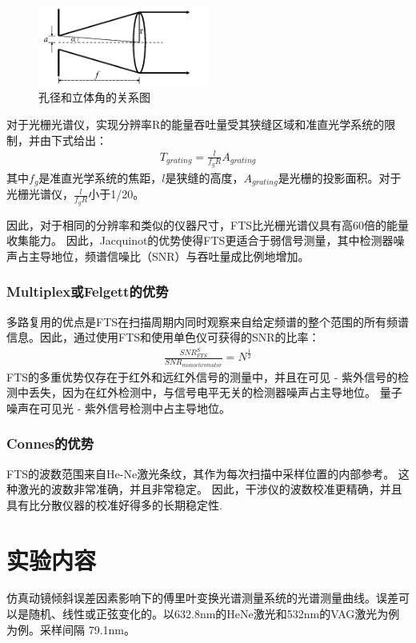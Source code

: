 \documentclass[conference]{IEEEtran}
\begin{document}
\begin{figure}[htbp]
    \centerline{\includegraphics[width=0.5\textwidth]{pic12.png}}
    \caption{孔径和立体角的关系图}
    \label{pic12}
\end{figure}

对于光栅光谱仪，实现分辨率R的能量吞吐量受其狭缝区域和准直光学系统的限制，并由下式给出：
\begin{align}
    T_{grating} = \frac{l}{f_gR}A_{grating}
\end{align}
其中$f_g$是准直光学系统的焦距，$l$是狭缝的高度，$A_{grating}$是光栅的投影面积。对于光栅光谱仪，$\frac{l}{f_gR}$小于1/20。

因此，对于相同的分辨率和类似的仪器尺寸，FTS比光栅光谱仪具有高60倍的能量收集能力。 因此，Jacquinot的优势使得FTS更适合于弱信号测量，其中检测器噪声占主导地位，频谱信噪比（SNR）与吞吐量成比例地增加。

\subsubsection{Multiplex或Felgett的优势} 
多路复用的优点是FTS在扫描周期内同时观察来自给定频谱的整个范围的所有频谱信息。因此，通过使用FTS和使用单色仪可获得的SNR的比率：
\begin{align}
    \frac{SNR^S_{FTS}}{SNR_{monochromator}} = N^{\frac{1}{2}}
\end{align}
FTS的多重优势仅存在于红外和远红外信号的测量中，并且在可见 - 紫外信号的检测中丢失，因为在红外检测中，与信号电平无关的检测器噪声占主导地位。 量子噪声在可见光 - 紫外信号检测中占主导地位。
\subsubsection{Connes的优势}
FTS的波数范围来自He-Ne激光条纹，其作为每次扫描中采样位置的内部参考。 这种激光的波数非常准确，并且非常稳定。 因此，干涉仪的波数校准更精确，并且具有比分散仪器的校准好得多的长期稳定性.


\section{实验内容}
仿真动镜倾斜误差因素影响下的傅里叶变换光谱测量系统的光谱测量曲线。误差可以是随机、线性或正弦变化的。以632.8nm的HeNe激光和532nm的VAG激光为例为例。采样间隔 79.1nm。
\end{document}

